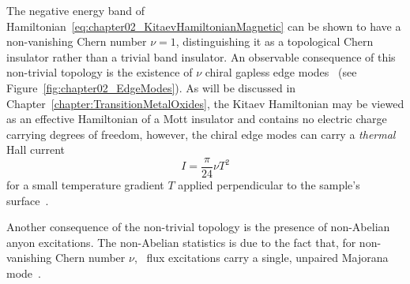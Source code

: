 The negative energy band of Hamiltonian~\eqref{eq:chapter02_KitaevHamiltonianMagnetic} can be shown to have a non-vanishing Chern number $\nu = 1$, distinguishing it as a topological Chern insulator rather than a trivial band insulator.
An observable consequence of this non-trivial topology is the existence of $\nu$ chiral gapless edge modes~\cite{HalperinPRB1982,HatsugaiPRL1993,SchulzBaldesJPA2000,KellendonkRMaP2002} (see Figure~\ref{fig:chapter02_EdgeModes}).
As will be discussed in Chapter~\ref{chapter:TransitionMetalOxides}, the Kitaev Hamiltonian may be viewed as an effective Hamiltonian of a Mott insulator and contains no electric charge carrying degrees of freedom, however, the chiral edge modes can carry a \textit{thermal} Hall current
%
\begin{equation}
	I = \frac{\pi}{24} \nu T^2
\end{equation}
%
for a small temperature gradient $T$ applied perpendicular to the sample's surface~\cite{KanePRB1997,CapelliNPB2002,KitaevAoP2006}.

Another consequence of the non-trivial topology is the presence of non-Abelian anyon excitations.
The non-Abelian statistics is due to the fact that, for non-\linebreak vanishing Chern number $\nu$, \ZZ~flux excitations carry a single, unpaired Majorana mode~\cite{KitaevAoP2006,LahtinenAoP2008}.


%
%
